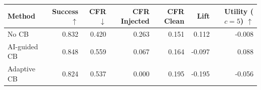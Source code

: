 \begin{tabular}{lrrrrrr}
\toprule
Method & Success $\uparrow$ & CFR $\downarrow$ & CFR Injected & CFR Clean & Lift & Utility ($c=5$) $\uparrow$ \\
\midrule
No CB & 0.832 & 0.420 & 0.263 & 0.151 & 0.112 & -0.008 \\
AI-guided CB & 0.848 & 0.559 & 0.067 & 0.164 & -0.097 & 0.088 \\
Adaptive CB & 0.824 & 0.537 & 0.000 & 0.195 & -0.195 & -0.056 \\
\bottomrule
\end{tabular}
